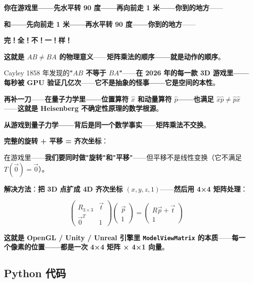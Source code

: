 \begin{tcolorbox}[ahabox={Aha: 矩阵乘法不交换——是游戏的物理}]
\textbf{你在游戏里——先水平转 90 度——再向前走 1 米——你到的地方}——

\medskip

\textbf{和——先向前走 1 米——再水平转 90 度——你到的地方}——

\medskip

\textbf{完！全！不！一！样！}

\medskip

\textbf{这就是 $AB \ne BA$ 的物理意义}——\textbf{矩阵乘法的顺序——就是动作的顺序}。

\medskip

Cayley 1858 年发现的\textbf{"$AB$ 不等于 $BA$"}——\textbf{在 2026 年的每一款 3D 游戏里——每秒被 GPU 验证几亿次}——\textbf{它不是抽象的怪事——它是空间的本性}。

\medskip

\textbf{再补一刀}——\textbf{在量子力学里——位置算符 $\hat{x}$ 和动量算符 $\hat{p}$——也满足 $\hat{x}\hat{p} \ne \hat{p}\hat{x}$}——\textbf{这就是 Heisenberg 不确定性原理的数学根源}。

\medskip

\textbf{从游戏到量子力学——背后是同一个数学事实}——\textbf{矩阵乘法不交换}。
\end{tcolorbox}

\textbf{完整的旋转 + 平移 = 齐次坐标}：

在游戏里——\textbf{我们要同时做"旋转"和"平移"}——但平移不是线性变换（它不满足 $T(\vec{0}) = \vec{0}$）。

\textbf{解决方法}：\textbf{把 3D 点扩成 4D 齐次坐标 $(x, y, z, 1)$}——\textbf{然后用 4×4 矩阵处理}：

\[
\begin{pmatrix} R_{3\times3} & \vec{t} \\ \vec{0}^T & 1 \end{pmatrix}
\begin{pmatrix} \vec{p} \\ 1 \end{pmatrix}
= \begin{pmatrix} R\vec{p} + \vec{t} \\ 1 \end{pmatrix}
\]

\textbf{这就是 OpenGL / Unity / Unreal 引擎里 \texttt{ModelViewMatrix} 的本质}——\textbf{每一个像素的位置——都是一次 4×4 矩阵 × 4×1 向量}。

\subsection{Python 代码}


